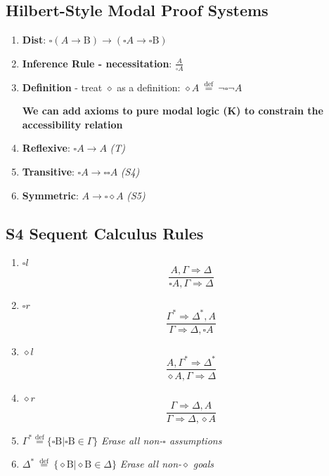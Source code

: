 \documentclass{article}
\begin{document}
\subsection{Hilbert-Style Modal Proof Systems}
\begin{enumerate}
    \item \textbf{Dist}: $\square(A \rightarrow \mathrm{B}) \rightarrow(\square A \rightarrow \square \mathrm{B})$
    \item \textbf{Inference Rule - necessitation}: $\frac{A}{\square A}$
    \item \textbf{Definition} - treat $\diamond$ as a definition: $\diamond A \stackrel{\text { def }}{=} \neg \square \neg A$
    
    \bigskip
    \textbf{We can add axioms to pure modal logic (K) to constrain the accessibility relation}
    \item \textbf{Reflexive}: $\square A \rightarrow A$ \textit{(T)}
    \item \textbf{Transitive}: $\square A \rightarrow \square \square A$ \textit{(S4)}
    \item \textbf{Symmetric}: $A \rightarrow \square \diamond A$ \textit{(S5)}
\end{enumerate}

\subsection{S4 Sequent Calculus Rules}
\begin{enumerate}
    \item \textbf{$\square l$}
    $$\frac{A, \Gamma \Rightarrow \Delta}{\square A, \Gamma \Rightarrow \Delta}$$
    
    \item \textbf{$\square r$}
    $$\frac{\Gamma^{*} \Rightarrow \Delta^{*}, A}{\Gamma \Rightarrow \Delta, \square A}$$
    
    \item \textbf{$\diamond l$}
    $$\frac{A, \Gamma^{*} \Rightarrow \Delta^{*}}{\diamond A, \Gamma \Rightarrow \Delta}$$
    
    \item \textbf{$\diamond r$}
    $$\frac{\Gamma \Rightarrow \Delta, A}{\Gamma \Rightarrow \Delta, \diamond A}$$
    
    \item $\Gamma^{*} \stackrel{\mathrm{def}}{=}\{\square \mathrm{B} | \square \mathrm{B} \in \Gamma\}$
    \subitem \textit{Erase all non-$\square$ assumptions}
    
    \item $\Delta^{*} \stackrel{\text { def }}{=}\{\diamond \mathrm{B} | \diamond \mathrm{B} \in \Delta\}$
    \subitem \textit{Erase all non-$\diamond$ goals}
\end{enumerate}
\end{document}
